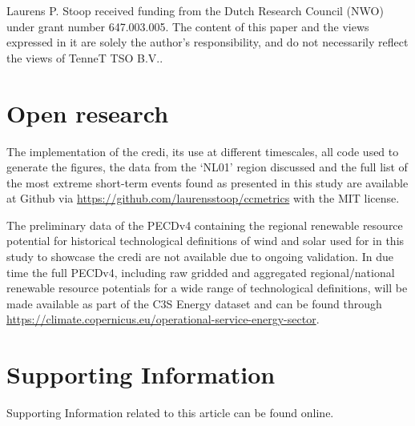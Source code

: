 \documentclass[12pt]{iopart}
\newcommand{\credi}[0]{{\sc credi}}
\begin{document}
\ack 
Laurens P. Stoop received funding from the  Dutch Research Council (NWO) under grant number 647.003.005. 
The content of this paper and the views expressed in it are solely the author’s responsibility, and do not necessarily reflect the views of TenneT TSO B.V..

\section*{Open research} 
The implementation of the \credi{}, its use at different timescales, all code used to generate the figures, the data from the `NL01' region discussed and the full list of the most extreme short-term events found as presented in this study are available at Github via \url{https://github.com/laurensstoop/ccmetrics} with the MIT license. 

The preliminary data of the PECDv4 containing the regional renewable resource potential for historical technological definitions of wind and solar used for in this study to showcase the \credi{} are not available due to ongoing validation. 
In due time the full PECDv4, including raw gridded and aggregated regional/national renewable resource potentials for a wide range of technological definitions, will be made available as part of the C3S Energy dataset and can be found through \url{https://climate.copernicus.eu/operational-service-energy-sector}. 


\appendix
\section{Supporting Information}
Supporting Information related to this article can be found online. %


\printbibliography 
\end{document}
